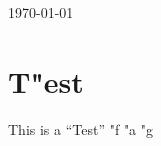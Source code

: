 \documentclass{book}
\begin{document}
\today

\chapter{T"est}
This is a "`Test"' "f "a "g
\end{document}
